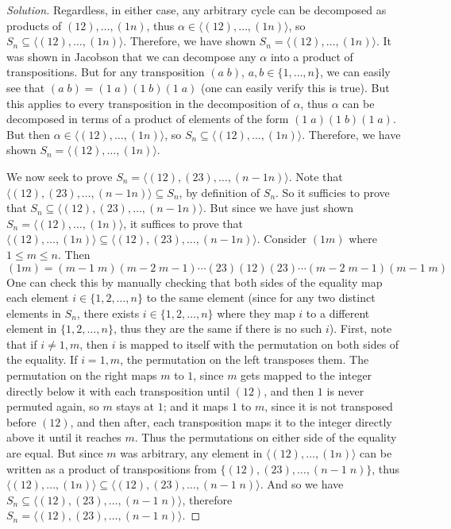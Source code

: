 \documentclass{article}
\begin{document}
\begin{proof}[Solution]
	Regardless, in either case, any arbitrary cycle can be decomposed
	as products of $(12),\dots,(1n)$,
	thus $\alpha \in \langle (12),\dots,(1n)\rangle$,
	so $S_n \subseteq \langle (12),\dots,(1n)\rangle$.
	Therefore,
	we have shown $S_n = \langle (12),\dots,(1n)\rangle$.
\fi
	It was shown in Jacobson that we can decompose any $\alpha$
	into a product of transpositions.
	But for any transposition $(a \; b)$, $a,b \in \{1,\dots,n\}$,
	we can easily see that $(a\; b) = (1\; a)(1 \; b)(1 \; a)$
	(one can easily verify this is true).
	But this applies to every transposition in the decomposition of $\alpha$,
	thus $\alpha$ can be decomposed in terms of a product of elements
	of the form $(1\; a)(1 \; b)(1 \; a)$.
	But then $\alpha \in \langle (12),\dots,(1n)\rangle$,
	so $S_n \subseteq \langle (12),\dots,(1n)\rangle$.
	Therefore,
	we have shown $S_n = \langle (12),\dots,(1n)\rangle$.

	We now seek to prove $S_n = \langle (12),(23),\dots,(n-1 n)\rangle$.
	Note that $\langle(12),(23),\dots,(n-1n)\rangle \subseteq S_n$,
	by definition of $S_n$.
	So it sufficies to prove that $S_n \subseteq \langle (12),(23),\dots,(n-1 n)\rangle$.
	But since we have just shown $S_n = \langle (12),\dots,(1n)\rangle$,
	it suffices to prove that $\langle (12),\dots,(1n)\rangle
	\subseteq \langle (12),(23),\dots,(n-1 n)\rangle$.
	Consider $(1m)$ where $1 \leq m \leq n$.
	Then
	\[
		(1m) = (m-1 \;m)(m-2\; m-1)\cdots (23)(12)(23)\cdots (m-2\; m-1)(m-1\; m)
	\]
	One can check this by manually checking that both sides of the equality map each element $i \in \{1,2,\dots,n\}$
	to the same element
	(since for any two distinct elements in $S_n$,
	there exists $i\in \{1,2,\dots,n\}$ where they
	map $i$ to a different element in $\{1,2,\dots,n\}$,
	thus they are the same if there is no such $i$).
	First, note that if $i \neq 1,m$,
	then $i$ is mapped to itself with the permutation on both sides of the equality.
	If $i = 1,m$, the permutation on the left transposes them.
	The permutation on the right maps $m$ to $1$,
	since $m$ gets mapped to the integer directly below it with each transposition
	until $(12)$,
	and then $1$ is never permuted again, so $m$ stays at $1$;
	and it maps $1$ to $m$,
	since it is not transposed before $(12)$,
	and then after,
	each transposition maps it to the integer directly above it until it reaches $m$.
	Thus the permutations on either side of the equality are equal.
	But since $m$ was arbitrary,
	any element in $\langle (12),\dots,(1n)\rangle$ can be written as a product of
	transpositions from $\{(12),(23),\dots,(n-1\;n)\}$,
	thus $\langle (12),\dots,(1n)\rangle \subseteq \langle(12),(23),\dots,(n-1\;n)\rangle$.
	And so we have $S_n \subseteq \langle(12),(23),\dots,(n-1\;n)\rangle$,
	therefore $S_n = \langle(12),(23),\dots,(n-1\;n)\rangle$.
\end{proof}
\end{document}
